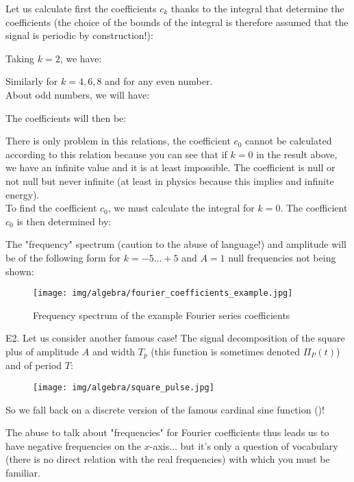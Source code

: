 	\pagebreak
	\begin{tcolorbox}[colframe=black,colback=white,sharp corners]
	Let us calculate first the coefficients $c_k$ thanks to the integral that determine the coefficients (the choice of the bounds of the integral is therefore assumed that the signal is periodic by construction!):
	
	Taking $k = 2$, we have:
	
	Similarly for $k = 4,6,8$ and for any even number.\\
	
	About odd numbers, we will have:
	
	The coefficients will then be:
	
	There is only problem in this relations, the coefficient $c_0$ cannot be calculated according to this relation because you can see that if $k = 0$ in the result above, we have an infinite value and it is at least impossible. The coefficient is null or not null  but never infinite (at least in physics because this implies and infinite energy).\\
	
	To find the coefficient $c_0$, we must calculate the integral for $k = 0$. The coefficient $c_0$ is then determined by:
	
	\end{tcolorbox}
	
	\pagebreak
	\begin{tcolorbox}[colframe=black,colback=white,sharp corners]
	The "frequency" spectrum (caution to the abuse of language!) and amplitude will be of the following form for $k=-5...+5$ and $A=1$ null frequencies not being shown:
	\begin{figure}[H]
		\centering
		\texttt{[image: img/algebra/fourier\_coefficients\_example.jpg]}
		\caption{Frequency spectrum of the example Fourier series coefficients}
	\end{figure}
	E2. Let us consider another famous case! The signal decomposition of the  square plus of amplitude $A$ and width $T_p$ (this function is sometimes denoted $\Pi_P(t)$) and of period $T$:
	\begin{figure}[H]
		\centering
		\texttt{[image: img/algebra/square\_pulse.jpg]}
	\end{figure}
	
	\end{tcolorbox}
	\begin{tcolorbox}[colframe=black,colback=white,sharp corners]
	
	So we fall back on a discrete version of the famous cardinal sine function ()!
	\end{tcolorbox}
	The abuse to talk about "frequencies" for Fourier coefficients thus leads us to have negative frequencies on the  $x$-axis... but it's only a question of vocabulary (there is no direct relation with the real frequencies) with which you must be familiar.
	
